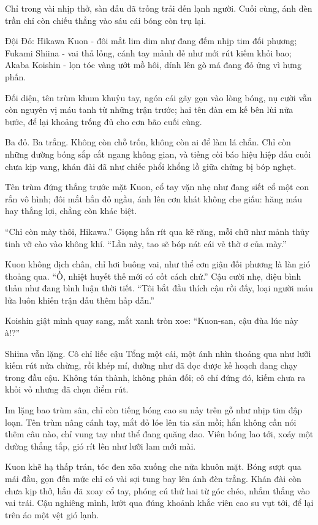\documentclass[../main.tex]{subfiles}
\begin{document}
Chỉ trong vài nhịp thở, sàn đấu đã trống trải đến lạnh người. Cuối cùng, ánh đèn trần chỉ còn chiếu thẳng vào sáu cái bóng còn trụ lại.

Đội Đỏ: Hikawa Kuon - đôi mắt lim dim như đang đếm nhịp tim đối phương; Fukami Shiina - vai thả lỏng, cánh tay mảnh dẻ như mới rút kiếm khỏi bao; Akaba Koishin - lọn tóc vàng ướt mồ hôi, dính lên gò má đang đỏ ửng vì hưng phấn.

Đối diện, tên trùm khum khuỷu tay, ngón cái gãy gọn vào lòng bóng, nụ cười vẫn còn nguyên vị máu tanh từ những trận trước; hai tên đàn em kế bên lùi nửa bước, để lại khoảng trống đủ cho cơn bão cuối cùng.

Ba đỏ. Ba trắng. Không còn chỗ trốn, không còn ai để làm lá chắn. Chỉ còn những đường bóng sắp cắt ngang không gian, và tiếng còi báo hiệu hiệp đấu cuối chưa kịp vang, khán đài đã như chiếc phổi khổng lồ giữa chừng bị bóp nghẹt.

Tên trùm đứng thẳng trước mặt Kuon, cổ tay vặn nhẹ như đang siết cổ một con rắn vô hình; đôi mắt hắn đỏ ngầu, ánh lên cơn khát không che giấu: hăng máu hay thắng lợi, chẳng còn khác biệt.

``Chỉ còn mày thôi, Hikawa.'' Giọng hắn rít qua kẽ răng, mỗi chữ như mảnh thủy tinh vỡ cào vào không khí. ``Lần này, tao sẽ bóp nát cái vẻ thờ ơ của mày.''

Kuon không dịch chân, chỉ hơi buông vai, như thể cơn giận đối phương là làn gió thoảng qua. ``Ồ, nhiệt huyết thế mới có cốt cách chứ.'' Cậu cười nhẹ, điệu bình thản như đang bình luận thời tiết. ``Tôi bắt đầu thích cậu rồi đấy, loại người máu lửa luôn khiến trận đấu thêm hấp dẫn.''

Koishin giật mình quay sang, mắt xanh tròn xoe: ``Kuon-san, cậu đùa lúc này à!?''

Shiina vẫn lặng. Cô chỉ liếc cậu Tổng một cái, một ánh nhìn thoáng qua như lưỡi kiếm rút nửa chừng, rồi khép mí, dường như đã đọc được kế hoạch đang chạy trong đầu cậu. Không tán thành, không phản đối; cô chỉ đứng đó, kiếm chưa ra khỏi vỏ nhưng đã chọn điểm rút.

Im lặng bao trùm sân, chỉ còn tiếng bóng cao su nảy trên gỗ như nhịp tim đập loạn. Tên trùm nâng cánh tay, mắt đỏ lóe lên tia săn mồi; hắn không cần nói thêm câu nào, chỉ vung tay như thể đang quăng dao. Viên bóng lao tới, xoáy một đường thẳng tắp, gió rít lên như lưỡi lam mới mài.

Kuon khẽ hạ thấp trán, tóc đen xõa xuống che nửa khuôn mặt. Bóng sượt qua mái đầu, gọn đến mức chỉ có vài sợi tung bay lên ánh đèn trắng. Khán đài còn chưa kịp thở, hắn đã xoay cổ tay, phóng cú thứ hai từ góc chéo, nhắm thẳng vào vai trái. Cậu nghiêng mình, lướt qua đúng khoảnh khắc viên cao su vụt tới, để lại trên áo một vệt gió lạnh.
\end{document}
